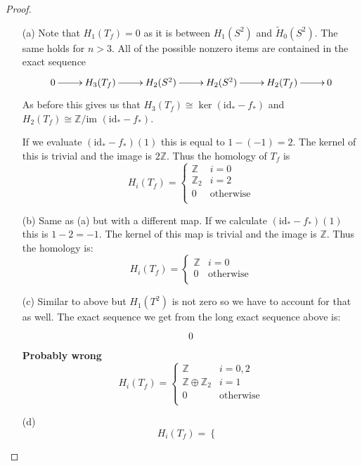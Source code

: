 \documentclass[10pt]{article}
\newcommand{\bb}[1]{\mathbb{#1}}
\newcommand{\rH}{\widetilde{H}}
\theoremstyle{plain}
\theoremstyle{remark}
\begin{document}
\begin{proof}
  \begin{enumerate}
  \item[(a)] Note that $H_1(T_f)=0$ as it is between $H_1(S^2)$ and $\rH_0(S^2)$.
    The same holds for $n>3$. All of the possible nonzero items are contained
    in the exact sequence
    \[
      \xymatrix{
        0\ar[r] & H_3(T_f) \ar[r] & H_2(S^2) \ar[r] & H_2(S^2) \ar[r] & H_2(T_f) \ar[r] & 0
      }
    \]
    As before this gives us that $H_3(T_f)\cong \ker (\mathrm{id}_*-f_*)$ and
    $H_2(T_f)\cong \bb{Z}/\text{im\ }(\mathrm{id}_*-f_*)$.

    If we evaluate $(\mathrm{id}_*-f_*)(1)$ this is equal to $1-(-1)=2$.
    The kernel of this is trivial and the image is $2\bb{Z}$. Thus the
    homology of $T_f$ is
    \[
      H_i(T_f) =
      \left\{
        \begin{array}{cr}
          \bb{Z} & i=0\\
          \bb{Z}_2 & i=2\\
          0 & \text{otherwise}\\
        \end{array}
      \right.
    \]
  \item[(b)] Same as (a) but with a different map. If we calculate $(\mathrm{id}_*-f_*)(1)$
    this is $1-2=-1$. The kernel of this map is trivial and the image is $\bb{Z}$. Thus
    the homology is:
    \[
      H_i(T_f) =
      \left\{
        \begin{array}{cr}
          \bb{Z} & i=0\\
          0 & \text{otherwise}\\
        \end{array}
      \right.
    \]
  \item[(c)]
    Similar to above but $H_1(T^2)$ is not zero so we have to account for that as well.
    The exact sequence we get from the long exact sequence above is:
    \[
      \xymatrix{
        0
      }
    \]
    \textbf{Probably wrong}
    \[
      H_i(T_f) =
      \left\{
        \begin{array}{cr}
          \bb{Z} & i=0,2\\
          \bb{Z}\oplus\bb{Z}_2 & i=1\\
          0 & \text{otherwise}\\
        \end{array}
      \right.
    \]
  \item[(d)]
    \[
      H_i(T_f) =
      \left\{
        \begin{array}{cr}

\end{array}\]
\end{enumerate}
\end{proof}
\end{document}
